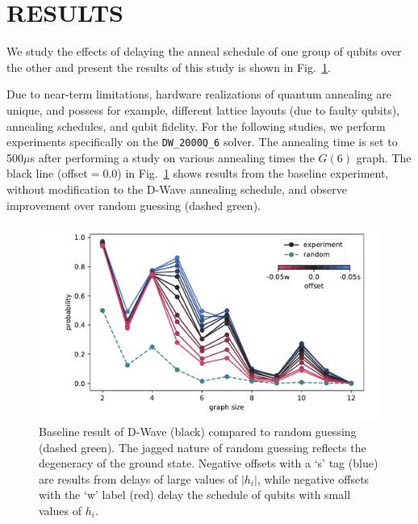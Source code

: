 \documentclass[10pt]{iopart}
\begin{document}
\section{RESULTS}
\label{sec:results}

We study the effects of delaying the anneal schedule of one group of qubits over the other and present the results of this study is shown in Fig.~\ref{fig:baseline}.

Due to near-term limitations, hardware realizations of quantum annealing are unique, and possess for example, different lattice layouts (due to faulty qubits), annealing schedules, and qubit fidelity.
For the following studies, we perform experiments specifically on the \texttt{DW\_2000Q\_6} solver. The annealing time is set to 500$\mu$s after performing a study on various annealing times the $G(6)$ graph. The black line (offset$=0.0$) in Fig.~\ref{fig:baseline} shows results from the baseline experiment, without modification to the D-Wave annealing schedule, and observe improvement over random guessing (dashed green).

\begin{figure}
	\centering
	\includegraphics[width=\columnwidth]{./new_figures/DWave_scaling.pdf}
	\caption{Baseline result of D-Wave (black) compared to random guessing (dashed green). The jagged nature of random guessing reflects the degeneracy of the ground state. Negative offsets with a `s' tag (blue) are results from delays of large values of $|h_i|$, while negative offsets with the `w' label (red) delay the schedule of qubits with small values of $h_i$.}
	\label{fig:baseline}
\end{figure}
\end{document}
